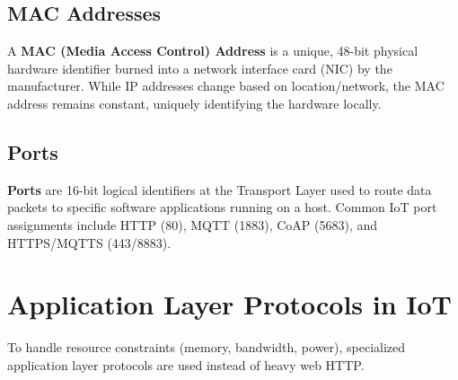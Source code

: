 \documentclass[12pt,a4paper]{article}
\begin{document}
\subsection{MAC Addresses}
A \textbf{MAC (Media Access Control) Address} is a unique, 48-bit physical hardware identifier burned into a network interface card (NIC) by the manufacturer. While IP addresses change based on location/network, the MAC address remains constant, uniquely identifying the hardware locally.

\subsection{Ports}
\textbf{Ports} are 16-bit logical identifiers at the Transport Layer used to route data packets to specific software applications running on a host. Common IoT port assignments include HTTP (80), MQTT (1883), CoAP (5683), and HTTPS/MQTTS (443/8883).

\section{Application Layer Protocols in IoT}

To handle resource constraints (memory, bandwidth, power), specialized application layer protocols are used instead of heavy web HTTP.
\end{document}
